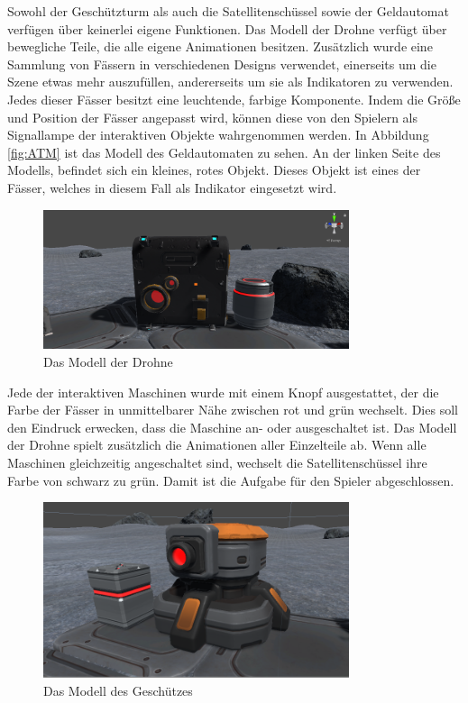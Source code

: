 Sowohl der Geschützturm als auch die Satellitenschüssel sowie der Geldautomat verfügen über keinerlei eigene Funktionen. Das Modell der Drohne verfügt über bewegliche Teile, die alle eigene Animationen besitzen. Zusätzlich wurde eine Sammlung von Fässern in verschiedenen Designs verwendet, einerseits um die Szene etwas mehr auszufüllen, andererseits um sie als Indikatoren zu verwenden. Jedes dieser Fässer besitzt eine leuchtende, farbige Komponente. Indem die Größe und Position der Fässer angepasst wird, können diese von den Spielern als Signallampe der interaktiven Objekte wahrgenommen werden. In Abbildung \ref{fig:ATM} ist das Modell des Geldautomaten zu sehen. An der linken Seite des Modells, befindet sich ein kleines, rotes Objekt. Dieses Objekt ist eines der Fässer, welches in diesem Fall als Indikator eingesetzt wird. 

\begin{figure}[H]
\centering
\includegraphics[width=0.8\textwidth]{Drone.PNG}
\caption{Das Modell der Drohne}
\end{figure}

Jede der interaktiven Maschinen wurde mit einem Knopf ausgestattet, der die Farbe der Fässer in unmittelbarer Nähe zwischen rot und grün wechselt. Dies soll den Eindruck erwecken, dass die Maschine an- oder ausgeschaltet ist. Das Modell der Drohne spielt zusätzlich die Animationen aller Einzelteile ab. Wenn alle Maschinen gleichzeitig angeschaltet sind, wechselt die Satellitenschüssel ihre Farbe von schwarz zu grün. Damit ist die Aufgabe für den Spieler abgeschlossen.\newline

\begin{figure}[H]
\centering
\includegraphics[width=0.8\textwidth]{Turret.PNG}
\caption{Das Modell des Geschützes}
\end{figure}

